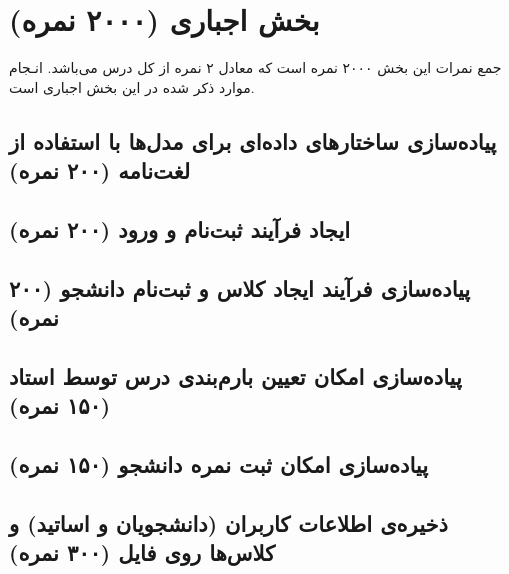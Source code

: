 \documentclass[a4paper]{report}
\begin{document}


\newpage
\tableofcontents

\newpage



\chapter{بخش اجباری (۲۰۰۰ نمره)}
\begin{center}
    \begin{warningbox}
        \Large
        جمع نمرات این بخش ۲۰۰۰ نمره است که معادل ۲ نمره از کل درس می‌باشد.
        انـجام موارد ذکر شده در این بخش اجباری است.
    \end{warningbox}
\end{center}

\section{پیاده‌سازی ساختارهای داده‌ای برای مدل‌ها با استفاده از لغت‌نامه (۲۰۰ نمره)}


\section{ایجاد فرآیند ثبت‌نام و ورود (۲۰۰ نمره)}


\section{پیاده‌سازی فرآیند ایجاد کلاس و ثبت‌نام دانشجو (۲۰۰ نمره)}


\section{پیاده‌سازی امکان تعیین بارم‌بندی درس توسط استاد (۱۵۰ نمره)}


\section{پیاده‌سازی امکان ثبت نمره دانشجو (۱۵۰ نمره)}


\section{ذخیره‌ی اطلاعات کاربران (دانشجویان و اساتید) و کلاس‌ها روی فایل (۳۰۰ نمره)}

\end{document}
